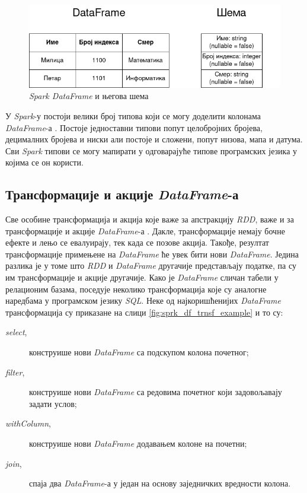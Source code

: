 \documentclass[12pt,oneside]{memoir}
\begin{document}
\begin{figure}[!ht]
  \centering
  \includegraphics[width=1\textwidth]{pictures/dataframe_schema.png}
  \caption{\textit{Spark DataFrame} и његова шема}
  \label{fig:sprk_df_schema_example}
\end{figure}

У \textit{Spark}-у постоји велики број типова који се могу доделити колонама \textit{DataFrame}-а \cite{spark_guide}. Постоје једноставни типови попут целобројних бројева, децималних бројева и ниски али постоје и сложени, попут низова, мапа и датума. Сви \textit{Spark} типови се могу мапирати у одговарајуће типове програмских језика у којима се он користи.

\subsection{Трансформације и акције \textit{DataFrame}-а}
\label{subsec:spark_sql_ac_tr}

Све особине трансформација и акција које важе за апстракцију \textit{RDD}, важе и за трансформације и акције \textit{DataFrame}-а \cite{spark_guide}. Дакле, трансформације немају бочне ефекте и лењо се евалуирају, тек када се позове акција. Такође, резултат трансформације примењене на \textit{DataFrame} ће увек бити нови \textit{DataFrame}. Једина разлика је у томе што \textit{RDD} и \textit{DataFrame} другачије представљају податке, па су им трансформације и акције другачије. Како је \textit{DataFrame} сличан табели у релационим базама, поседује неколико трансформација које су аналогне наредбама у програмском језику \textit{SQL}. Неке од најкоришћенијих \textit{DataFrame} трансформација су приказане на слици \ref{fig:sprk_df_trnsf_example} и то су:

\begin{description} 
	\item[\textit{select},] конструише нови \textit{DataFrame} са подскупом колона почетног;
	\item[\textit{filter},] конструише нови \textit{DataFrame} са редовима почетног који задовољавају задати услов;
	\item[\textit{withColumn},] конструише нови \textit{DataFrame} додавањем колоне на почетни;
		\item[\textit{join},] спаја два \textit{DataFrame}-а у један на основу заједничких вредности колона.
\end{description}
\end{document}
